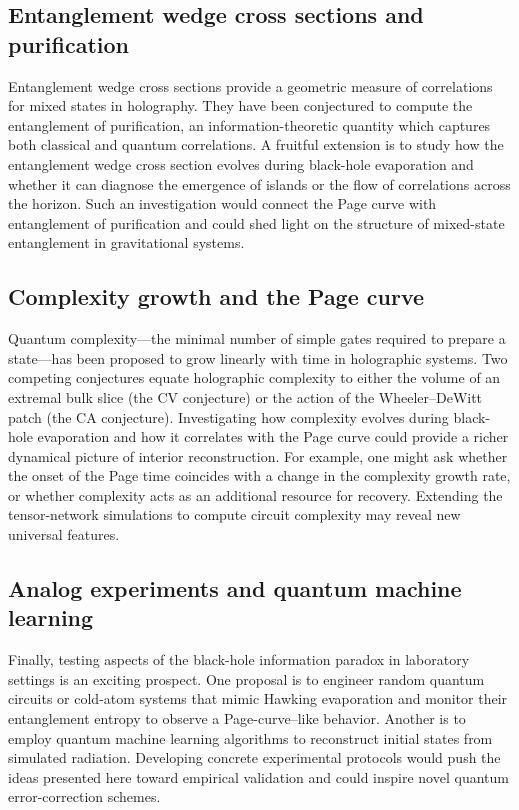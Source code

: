 \documentclass[12pt]{article}
\begin{document}
\subsection{Entanglement wedge cross sections and purification}
Entanglement wedge cross sections provide a geometric measure of correlations for mixed states in holography\cite{Takayanagi:2018eop}.  They have been conjectured to compute the entanglement of purification, an information-theoretic quantity which captures both classical and quantum correlations.  A fruitful extension is to study how the entanglement wedge cross section evolves during black-hole evaporation and whether it can diagnose the emergence of islands or the flow of correlations across the horizon.  Such an investigation would connect the Page curve with entanglement of purification and could shed light on the structure of mixed-state entanglement in gravitational systems.

\subsection{Complexity growth and the Page curve}
Quantum complexity—the minimal number of simple gates required to prepare a state—has been proposed to grow linearly with time in holographic systems\cite{Carmi:2017hc}.  Two competing conjectures equate holographic complexity to either the volume of an extremal bulk slice (the CV conjecture) or the action of the Wheeler–DeWitt patch (the CA conjecture)\cite{Carmi:2017hc}.  Investigating how complexity evolves during black-hole evaporation and how it correlates with the Page curve could provide a richer dynamical picture of interior reconstruction.  For example, one might ask whether the onset of the Page time coincides with a change in the complexity growth rate, or whether complexity acts as an additional resource for recovery.  Extending the tensor-network simulations to compute circuit complexity may reveal new universal features.

\subsection{Analog experiments and quantum machine learning}
Finally, testing aspects of the black-hole information paradox in laboratory settings is an exciting prospect.  One proposal is to engineer random quantum circuits or cold-atom systems that mimic Hawking evaporation and monitor their entanglement entropy to observe a Page-curve–like behavior.  Another is to employ quantum machine learning algorithms to reconstruct initial states from simulated radiation.  Developing concrete experimental protocols would push the ideas presented here toward empirical validation and could inspire novel quantum error-correction schemes.
\end{document}
